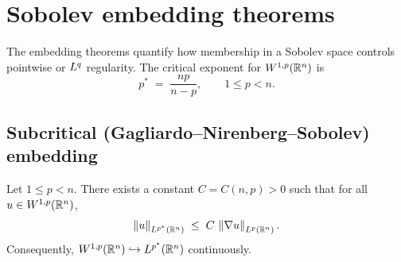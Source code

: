 \section{Sobolev embedding theorems}\label{sec:embeddings}

The embedding theorems quantify how membership in a Sobolev space controls pointwise
or $L^{q}$ regularity.  The critical exponent for $W^{1,p}(\mathbb{R}^{n})$ is
\[
  p^{*}
  \;=\;
  \frac{np}{n - p},
  \qquad 1 \le p < n.
\]

\subsection{Subcritical (Gagliardo--Nirenberg--Sobolev) embedding}

\begin{theorem}%
  \label{thm:sobolev-subcritical}
  Let $1 \le p < n$.  There exists a constant $C = C(n, p) > 0$ such that for all
  $u \in W^{1,p}(\mathbb{R}^{n})$,
  \begin{equation}\label{eq:sobolev-subcritical}
    \left\lVert u \right\rVert_{L^{p^{*}}(\mathbb{R}^{n})}
    \;\le\;
    C\,\left\lVert \nabla u \right\rVert_{L^{p}(\mathbb{R}^{n})}.
  \end{equation}
  Consequently, $W^{1,p}(\mathbb{R}^{n}) \hookrightarrow L^{p^{*}}(\mathbb{R}^{n})$ continuously.
\end{theorem}

